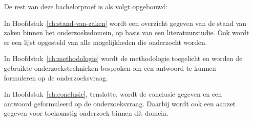 De rest van deze bachelorproef is als volgt opgebouwd:

In Hoofdstuk~\ref{ch:stand-van-zaken} wordt een overzicht gegeven van de stand van zaken binnen het onderzoeksdomein, op basis van een literatuurstudie. Ook wordt er een lijst opgesteld van alle mogelijkheden die onderzocht worden.

In Hoofdstuk~\ref{ch:methodologie} wordt de methodologie toegelicht en worden de gebruikte onderzoekstechnieken besproken om een antwoord te kunnen formuleren op de onderzoeksvraag.


In Hoofdstuk~\ref{ch:conclusie}, tenslotte, wordt de conclusie gegeven en een antwoord geformuleerd op de onderzoeksvraag. Daarbij wordt ook een aanzet gegeven voor toekomstig onderzoek binnen dit domein.

















